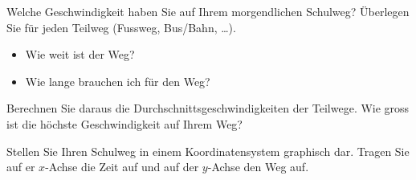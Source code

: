 \begin{aufgabe}
Welche Geschwindigkeit haben Sie auf Ihrem morgendlichen Schulweg?
Überlegen Sie für jeden Teilweg (Fussweg, Bus/Bahn, \ldots).
\begin{itemize}
	\item Wie weit ist der Weg?
	\item Wie lange brauchen ich für den Weg?
\end{itemize}
Berechnen Sie daraus die Durchschnittsgeschwindigkeiten der Teilwege.
Wie gross ist die höchste Geschwindigkeit auf Ihrem Weg?

Stellen Sie Ihren Schulweg in einem Koordinatensystem graphisch dar. 
Tragen Sie auf er $x$-Achse die Zeit auf und auf der $y$-Achse den Weg auf.
\end{aufgabe}
